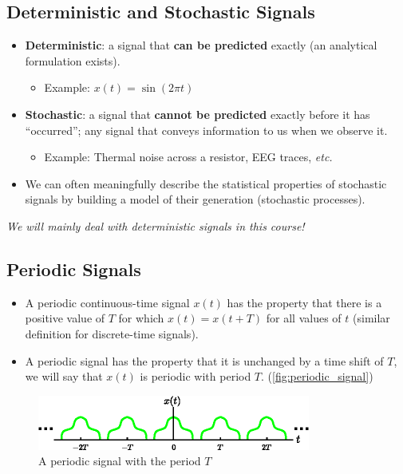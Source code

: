 \subsection{Deterministic and Stochastic Signals}
 \begin{itemize}
    \item \textbf{Deterministic}: a signal that \textbf{can be predicted} exactly (an analytical formulation exists). 
     \begin{itemize}
        \item Example: $x(t) = \sin(2\pi t)$
      \end{itemize}
      
    \item \textbf{Stochastic}: a signal that \textbf{cannot be predicted} exactly before it has “occurred”; any signal that conveys information to us when we observe it. 
      \begin{itemize}
        \item Example: Thermal noise across a resistor, EEG traces, \textit{etc.}
      \end{itemize}
      
    \item We can often meaningfully describe the statistical properties of stochastic signals by building a model of their generation (stochastic processes).
 \end{itemize}
\textit{We will mainly deal with deterministic signals in this course!}

\subsection{Periodic Signals}
\begin{itemize}
    \item A periodic continuous-time signal $x(t)$ has the property that there is a positive value of $T$ for which $x(t) = x(t+T)$ for all values of $t$ (similar definition for discrete-time signals).
    
    \item A periodic signal has the property that it is unchanged by a time shift of $T$, we will say that $x(t)$ is periodic with period $T$. (\autoref{fig:periodic_signal})
\end{itemize}
\begin{figure}[H]
    \centering
    \includegraphics[width = 0.8\textwidth]{images/periodic_signal.eps}
    \caption{A periodic signal with the period $T$}
    \label{fig:periodic_signal}
\end{figure}

